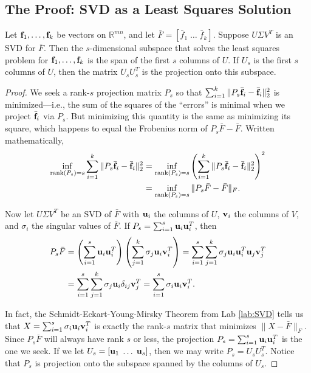 \subsection*{The Proof: SVD as a Least Squares Solution} %
\begin{theorem}
Let $\mathbf{f}_1, \ldots, \mathbf{f}_k$ be vectors on $\mathbb{R}^{mn}$, and let $\bar{F} = [\bar{f}_1 \; \ldots \; \bar{f}_k]$. Suppose $U\Sigma V^T$ is an SVD for $\bar{F}$. Then the $s$-dimensional subspace that solves the least squares problem for $\mathbf{f}_1, \ldots, \mathbf{f}_k$ is the span of the first $s$ columns of $U$. If $U_s$ is the first $s$ columns of $U$, then the matrix $U_sU_s^T$ is the projection onto this subspace.
\end{theorem}
\begin{proof}
We seek a rank-$s$ projection matrix $P_s$ so that $\sum_{i=1}^k \|P_s\bar{\mathbf{f}}_i - \bar{\mathbf{f}}_i\|_2^2$ is minimized---i.e.,
 the sum of the squares of the ``errors'' is minimal when we project $\bar{\mathbf{f}}_i$ via $P_s$.
 But minimizing this quantity is the same as minimizing its square, which happens to equal the Frobenius norm of $P_s\bar{F} - \bar{F}$.
Written mathematically,
 \begin{align*}
\inf_{\text{rank}(P_s)=s} \sum_{i=1}^k \|P_s\bar{\mathbf{f}}_i - \bar{\mathbf{f}}_i\|_2^2 &=  \inf_{\text{rank}(P_s)=s} \left( \sum_{i=1}^k \|P_s\bar{\mathbf{f}}_i - \bar{\mathbf{f}}_i\|_2^2 \right) ^2\\
 & =  \inf_{\text{rank}(P_s)=s} \| P_s\bar{F}-\bar{F}\|_F.
 \end{align*}

Now let $U \Sigma V^T$ be an SVD of $\bar{F}$ with $\mathbf{u}_i$ the columns of $U$, $\mathbf{v}_i$ the columns of $V$, and $\sigma_i$ the singular values of $\bar{F}$.
If $P_s = \sum_{i=1}^s \mathbf{u}_i \mathbf{u}_i^T$, then
\begin{align*}
P_s\bar{F} &=  \left( \sum_{i=1}^s \mathbf{u}_i \mathbf{u}_i^T \right)\left(  \sum_{j=1}^k \sigma_j \mathbf{u}_i \mathbf{v}_i^T \right)
= \sum_{i=1}^s\sum_{j=1}^k \sigma_j \mathbf{u}_i\mathbf{u}_i^T\mathbf{u}_j\mathbf{v}_j^T\\
&=  \sum_{i=1}^s\sum_{j=1}^k \sigma_j \mathbf{u}_i\delta_{ij}\mathbf{v}_j^T
= \sum_{i=1}^s \sigma_i \mathbf{u}_i\mathbf{v}_i^T.
\end{align*}

In fact, the Schmidt-Eckart-Young-Mirsky Theorem from Lab \ref{lab:SVD} tells us that $X = \sum_{i=1}^s \sigma_i \mathbf{u}_i\mathbf{v}_i^T$ is exactly the rank-$s$ matrix that minimizes $\|X - \bar{F}\|_F$.
Since $P_s \bar{F}$ will always have rank $s$ or less, the projection $P_s =  \sum_{i=1}^s \mathbf{u}_i \mathbf{u}_i^T$ is the one we seek.
If we let $U_s = [ \mathbf{u}_1\; \ldots \; \mathbf{u}_s]$, then we may write $P_s = U_sU_s^T$. Notice that $P_s$ is projection onto the subspace spanned by the columns of $U_s$.
\end{proof}

